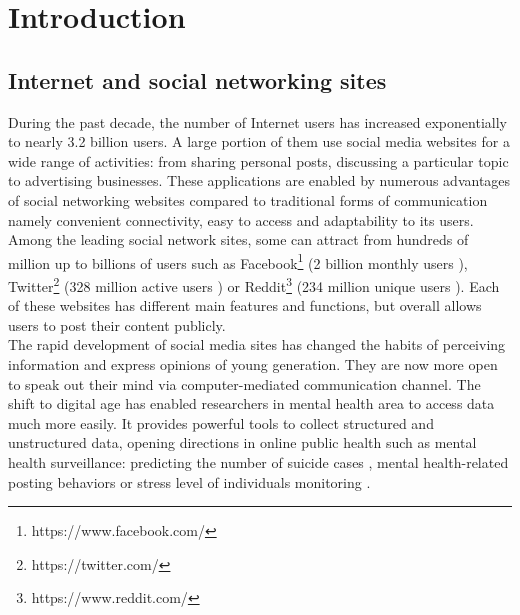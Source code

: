 
\chapter{Introduction}

\section{Internet and social networking sites}
During the past decade, the number of Internet users has increased exponentially to nearly 3.2 billion users. A large portion of them use social media websites for a wide range of activities: from sharing personal posts, discussing a particular topic to advertising businesses. These applications are enabled by numerous advantages of social networking websites compared to traditional forms of communication namely convenient connectivity, easy to access and adaptability to its users. Among the leading social network sites, some can attract from hundreds of million up to billions of users such as Facebook\footnote{https://www.facebook.com/} (2 billion monthly users \cite{Welch2017}), Twitter\footnote{https://twitter.com/} (328 million active users \cite{Aslam2017}) or Reddit\footnote{https://www.reddit.com/} (234 million unique users \cite{Alexa2017}). Each of these websites has different main features and functions, but overall allows users to post their content publicly.\\
The rapid development of social media sites has changed the habits of perceiving information and express opinions of young generation. They are now more open to speak out their mind via computer-mediated communication channel. The shift to digital age has enabled researchers in mental health area to access data much more easily. It provides powerful tools to collect structured and unstructured data, opening directions in online public health such as mental health surveillance: predicting the number of suicide cases \cite{Won2013}, mental health-related posting behaviors \cite{Berry2017} or stress level of individuals monitoring \cite{Liu2017}. \\
